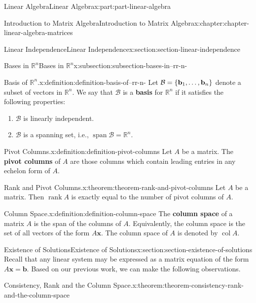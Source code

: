 \documentclass[twoside,10pt,]{book}
\newcommand{\terminology}[1]{\textbf{#1}}
\numberwithin{equation}{part}
\newcommand{\RR}{\mathbb{R}}
\providecommand{\vb}[1]{\mathbf{#1}}
\newcommand{\col}[1]{\operatorname{col}{#1}}
\providecommand{\rank}[1]{\operatorname{rank}{#1}}
\newcommand{\spn}[1]{\operatorname{span}{#1}}
\begin{document}
\begin{partptx}{Linear Algebra}{}{Linear Algebra}{}{}{x:part:part-linear-algebra}
\begin{chapterptx}{Introduction to Matrix Algebra}{}{Introduction to Matrix Algebra}{}{}{x:chapter:chapter-linear-algebra-matrices}
\begin{sectionptx}{Linear Independence}{}{Linear Independence}{}{}{x:section:section-linear-independence}
\begin{subsectionptx}{Bases in \(\RR^n\)}{}{Bases in \(\RR^n\)}{}{}{x:subsection:subsection-bases-in--rr-n-}
\begin{definition}{Basis of \(\RR^n\).}{x:definition:definition-basis-of--rr-n-}
%
Let \(\mathcal{B} = \qty{\vb{b}_1,\ldots,\vb{b}_n}\) denote a subset of vectors in \(\RR^n\). We say that \(\mathcal{B}\) is a \terminology{basis} for \(\RR^n\) if it satisfies the following properties:%
\begin{enumerate}
\item{}\(\mathcal{B}\) is linearly independent.%
\item{}\(\mathcal{B}\) is a spanning set, i.e., \(\spn{\mathcal{B}} = \RR^n\).%
\end{enumerate}
%
\end{definition}
\end{subsectionptx}
\begin{definition}{Pivot Columns.}{x:definition:definition-pivot-columns}%
%
Let \(A\) be a matrix. The \terminology{pivot columns} of \(A\) are those columns which contain leading entries in any echelon form of \(A\).%
\end{definition}
\begin{theorem}{Rank and Pivot Columns.}{}{x:theorem:theorem-rank-and-pivot-columns}%
Let \(A\) be a matrix. Then \(\rank{A}\) is exactly equal to the number of pivot columns of \(A\).%
\end{theorem}
\begin{definition}{Column Space.}{x:definition:definition-column-space}%
%
The \terminology{column space} of a matrix \(A\) is the span of the columns of \(A\). Equivalently, the column space is the set of all vectors of the form \(A\vb{x}\). The column space of \(A\) is denoted by \(\col{A}\).%
\end{definition}
\end{sectionptx}
%
%
\typeout{************************************************}
\typeout{************************************************}
%
\begin{sectionptx}{Existence of Solutions}{}{Existence of Solutions}{}{}{x:section:section-existence-of-solutions}
Recall that any linear system may be expressed as a matrix equation of the form \(A\vb{x} = \vb{b}\). Based on our previous work, we can make the following observations.%
\begin{theorem}{Consistency, Rank and the Column Space.}{}{x:theorem:theorem-consistency-rank-and-the-column-space}%
%
%

\end{theorem}
\end{sectionptx}
\end{chapterptx}
\end{partptx}
\end{document}
